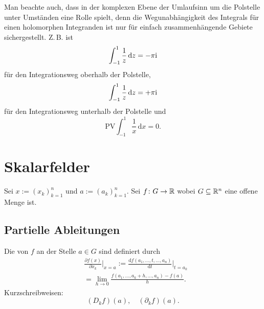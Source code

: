 Man beachte auch, dass in der komplexen Ebene der Umlaufsinn um
die Polstelle unter Umständen eine Rolle spielt, denn die
Wegunabhängigkeit des Integrals für einen holomorphen Integranden
ist nur für einfach zusammenhängende Gebiete
sichergestellt. Z.\,B. ist
\begin{equation}
\int_{-1}^1 \frac{1}{z}\,\mathrm dz = -\pi\mathrm i
\end{equation}
für den Integrationsweg oberhalb der Polstelle,
\begin{equation}
\int_{-1}^1 \frac{1}{z}\,\mathrm dz = +\pi\mathrm i
\end{equation}
für den Integrationsweg unterhalb der Polstelle und
\begin{equation}
\mathrm{PV}\int_{-1}^1 \frac{1}{x}\,\mathrm dx = 0.
\end{equation}

\section{Skalarfelder}
Sei $x:=(x_k)_{k=1}^n$ und $a:=(a_k)_{k=1}^n$. Sei $f\colon G\to\mathbb R$
wobei $G\subseteq\mathbb R^n$ eine offene Menge ist.
\subsection{Partielle Ableitungen}
\begin{definition}\mbox{}\newline
Die 
von $f$ an der Stelle $a\in G$ sind definiert durch
\begin{equation}
\begin{split}
&\frac{\partial f(x)}{\partial x_k}\bigg|_{x=a}
:= \frac{\mathrm df(a_1,\ldots,t,\ldots,a_n)}{\mathrm dt}\bigg|_{t=a_k}\\
&= \lim_{h\to 0}\frac{f(a_1,\ldots,a_k+h,\ldots,a_n)-f(a)}{h}.
\end{split}
\end{equation}
Kurzschreibweisen:
\begin{equation}
(D_k f)(a),\quad (\partial_k f)(a).
\end{equation}
\end{definition}
